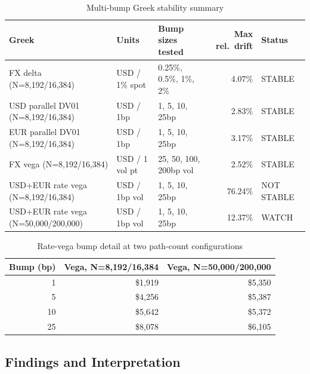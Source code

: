 \documentclass[conference]{IEEEtran}
\begin{document}
\begin{table}[!t]
\centering
\begin{tabular}{lllrl}
\toprule
\textbf{Greek} & \textbf{Units} & \textbf{Bump sizes tested} & \textbf{Max rel.\ drift} & \textbf{Status} \\
\midrule
FX delta (N=8,192/16,384) & USD / 1\% spot & 0.25\%, 0.5\%, 1\%, 2\% & 4.07\% & \textcolor{pass}{STABLE} \\
USD parallel DV01 (N=8,192/16,384) & USD / 1bp & 1, 5, 10, 25bp & 2.83\% & \textcolor{pass}{STABLE} \\
EUR parallel DV01 (N=8,192/16,384) & USD / 1bp & 1, 5, 10, 25bp & 3.17\% & \textcolor{pass}{STABLE} \\
FX vega (N=8,192/16,384) & USD / 1 vol pt & 25, 50, 100, 200bp vol & 2.52\% & \textcolor{pass}{STABLE} \\
USD+EUR rate vega (N=8,192/16,384) & USD / 1bp vol & 1, 5, 10, 25bp & 76.24\% & \textcolor{attention}{NOT STABLE} \\
USD+EUR rate vega (N=50,000/200,000) & USD / 1bp vol & 1, 5, 10, 25bp & 12.37\% & \textcolor{conditional}{WATCH} \\
\bottomrule
\end{tabular}
\caption{Multi-bump Greek stability summary\label{tab:greek-summary}}
\end{table}

\begin{table}[H]
\centering
\begin{tabular}{rrr}
\toprule
\textbf{Bump (bp)} & \textbf{Vega, N=8,192/16,384} & \textbf{Vega, N=50,000/200,000} \\
\midrule
1 & \$1,919 & \$5,350 \\
5 & \$4,256 & \$5,387 \\
10 & \$5,642 & \$5,372 \\
25 & \$8,078 & \$6,105 \\
\bottomrule
\end{tabular}
\caption{Rate-vega bump detail at two path-count configurations}
\end{table}

\subsection{Findings and Interpretation}
\end{document}
